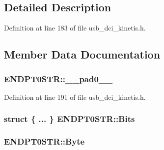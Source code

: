 \subsection{Detailed Description}


Definition at line 183 of file usb\+\_\+dci\+\_\+kinetis.\+h.



\subsection{Member Data Documentation}
\subsubsection[{\texorpdfstring{\+\_\+\+\_\+pad0\+\_\+\+\_\+}{__pad0__}}]{ E\+N\+D\+P\+T0\+S\+T\+R\+::\+\_\+\+\_\+pad0\+\_\+\+\_\+}\hypertarget{union_e_n_d_p_t0_s_t_r_a8c95dcb61ebda1d9ea309ca104175879}{}\label{union_e_n_d_p_t0_s_t_r_a8c95dcb61ebda1d9ea309ca104175879}


Definition at line 191 of file usb\+\_\+dci\+\_\+kinetis.\+h.

\subsubsection[{\texorpdfstring{Bits}{Bits}}]{\setlength{\rightskip}{0pt plus 5cm}struct \{ ... \}   E\+N\+D\+P\+T0\+S\+T\+R\+::\+Bits}\hypertarget{union_e_n_d_p_t0_s_t_r_af8d8a299854c30df91dd71a1de681133}{}\label{union_e_n_d_p_t0_s_t_r_af8d8a299854c30df91dd71a1de681133}
\subsubsection[{\texorpdfstring{Byte}{Byte}}]{ E\+N\+D\+P\+T0\+S\+T\+R\+::\+Byte}\hypertarget{union_e_n_d_p_t0_s_t_r_a82be795788f6efb746682f7f023953b4}{}\label{union_e_n_d_p_t0_s_t_r_a82be795788f6efb746682f7f023953b4}



